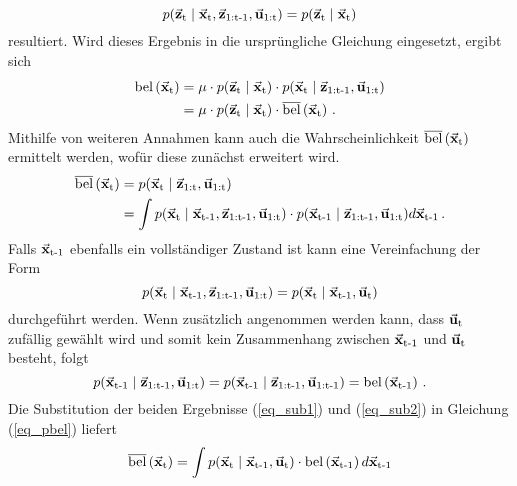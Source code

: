 \begin{equation}
p({\vec{\mathbf{z}}_{\text{t}}} \hspace{1mm} \vert \hspace{1mm} {\vec{\mathbf{x}}_{\text{t}},\vec{\mathbf{z}}_{\text{1:t-1}},\vec{\mathbf{u}}_{\text{1:t}}}) = p({\vec{\mathbf{z}}_{\text{t}}} \hspace{1mm} \vert \hspace{1mm} {\vec{\mathbf{x}}_{\text{t}}})
\end{equation}
resultiert. Wird dieses Ergebnis in die ursprüngliche Gleichung eingesetzt, ergibt sich
\begin{equation}
\label{eq_contbayes2}
\begin{split}
\bel{\mVec{x}\idx{t}} &= \mu \cdot \condP{\mVec{z}\idx{t}}{\mVec{x}\idx{t}}\cdot \condP{\mVec{x}\idx{t}}{\mVec{z}\idx{1:t-1},\mVec{u}\idx{1:t}} 
\\
&= \mu \cdot \condP{\mVec{z}\idx{t}}{\mVec{x}\idx{t}}\cdot \pbel{\mVec{x}\idx{t}}\,.
\end{split}
\end{equation}
Mithilfe von weiteren Annahmen kann auch die Wahrscheinlichkeit $\overline{\text{bel}}\left({\vec{\mathbf{x}}_{\text{t}}}\right)$ ermittelt werden, wofür diese zunächst erweitert wird.
\begin{equation}
\label{eq_pbel}
\begin{split}
\pbel{\mVec{x}\idx{t}} &= \condP{\mVec{x}\idx{t}}{\mVec{z}\idx{1:t},\mVec{u}\idx{1:t}}
\\
&= \int \condP{\mVec{x}\idx{t}}{\mVec{x}\idx{t-1},\mVec{z}\idx{1:t-1},\mVec{u}\idx{1:t}}\cdot \condP{\mVec{x}\idx{t-1}}{\mVec{z}\idx{1:t-1},\mVec{u}\idx{1:t}}d\mVec{x}\idx{t-1}\,.
\end{split}
\end{equation}
Falls $\vec{\mathbf{x}}_{\text{t-1}}$ ebenfalls ein vollständiger Zustand ist kann eine Vereinfachung der Form
\begin{equation}
\label{eq_sub1}
\condP{\mVec{x}\idx{t}}{\mVec{x}\idx{t-1},\mVec{z}\idx{1:t-1},\mVec{u}\idx{1:t}}=\condP{\mVec{x}\idx{t}}{\mVec{x}\idx{t-1},\mVec{u}\idx{t}}
\end{equation}
durchgeführt werden. Wenn zusätzlich angenommen werden kann, dass $\vec{\mathbf{u}}_{\text{t}}$ zufällig gewählt wird und somit kein Zusammenhang zwischen $\vec{\mathbf{x}}_{\text{t-1}}$ und $\vec{\mathbf{u}}_{\text{t}}$ besteht, folgt
\begin{equation}
\label{eq_sub2}
\condP{\mVec{x}\idx{t-1}}{\mVec{z}\idx{1:t-1},\mVec{u}\idx{1:t}} = \condP{\mVec{x}\idx{t-1}}{\mVec{z}\idx{1:t-1},\mVec{u}\idx{1:t-1}} = \bel{\mVec{x}\idx{t-1}}\,.
\end{equation}
Die Substitution der beiden Ergebnisse (\ref{eq_sub1}) und (\ref{eq_sub2}) in Gleichung (\ref{eq_pbel}) liefert
\begin{equation}
\label{eq_contbayes1}
\pbel{\mVec{x}\idx{t}} = \int \condP{\mVec{x}\idx{t}}{\mVec{x}\idx{t-1},\mVec{u}\idx{t}}\cdot \bel{\mVec{x}\idx{t-1}}d\mVec{x}\idx{t-1}
\end{equation}
